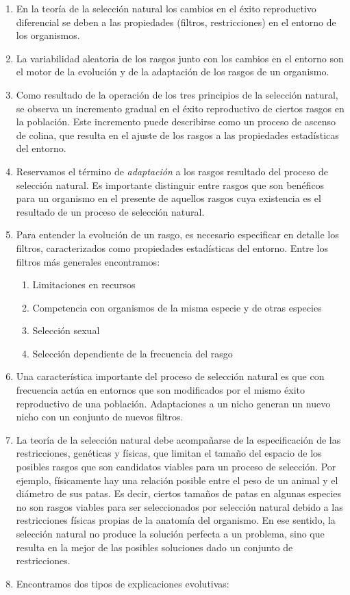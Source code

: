 \documentclass[
  letterpaper,
]{book}
\providecommand{\tightlist}{%
  \setlength{\itemsep}{0pt}\setlength{\parskip}{0pt}}\usepackage{longtable,booktabs,array}
\begin{document}
\begin{enumerate}
\def\labelenumi{\arabic{enumi}.}
\item
  En la teoría de la selección natural los cambios en el éxito
  reproductivo diferencial se deben a las propiedades (filtros,
  restricciones) en el entorno de los organismos.
\item
  La variabilidad aleatoria de los rasgos junto con los cambios en el
  entorno son el motor de la evolución y de la adaptación de los rasgos
  de un organismo.
\item
  Como resultado de la operación de los tres principios de la selección
  natural, se observa un incremento gradual en el éxito reproductivo de
  ciertos rasgos en la población. Este incremento puede describirse como
  un proceso de ascenso de colina, que resulta en el ajuste de los
  rasgos a las propiedades estadísticas del entorno.
\item
  Reservamos el término de \emph{adaptación} a los rasgos resultado del
  proceso de selección natural. Es importante distinguir entre rasgos
  que son benéficos para un organismo en el presente de aquellos rasgos
  cuya existencia es el resultado de un proceso de selección natural.
\item
  Para entender la evolución de un rasgo, es necesario especificar en
  detalle los filtros, caracterizados como propiedades estadísticas del
  entorno. Entre los filtros más generales encontramos:

  \begin{enumerate}
  \def\labelenumii{\alph{enumii}.}
  \tightlist
  \item
    Limitaciones en recursos
  \item
    Competencia con organismos de la misma especie y de otras especies
  \item
    Selección sexual
  \item
    Selección dependiente de la frecuencia del rasgo
  \end{enumerate}
\item
  Una característica importante del proceso de selección natural es que
  con frecuencia actúa en entornos que son modificados por el mismo
  éxito reproductivo de una población. Adaptaciones a un nicho generan
  un nuevo nicho con un conjunto de nuevos filtros.
\item
  La teoría de la selección natural debe acompañarse de la
  especificación de las restricciones, genéticas y físicas, que limitan
  el tamaño del espacio de los posibles rasgos que son candidatos
  viables para un proceso de selección. Por ejemplo, físicamente hay una
  relación posible entre el peso de un animal y el diámetro de sus
  patas. Es decir, ciertos tamaños de patas en algunas especies no son
  rasgos viables para ser seleccionados por selección natural debido a
  las restricciones físicas propias de la anatomía del organismo. En ese
  sentido, la selección natural no produce la solución perfecta a un
  problema, sino que resulta en la mejor de las posibles soluciones dado
  un conjunto de restricciones.
\item
  Encontramos dos tipos de explicaciones evolutivas:


\end{enumerate}
\end{document}
